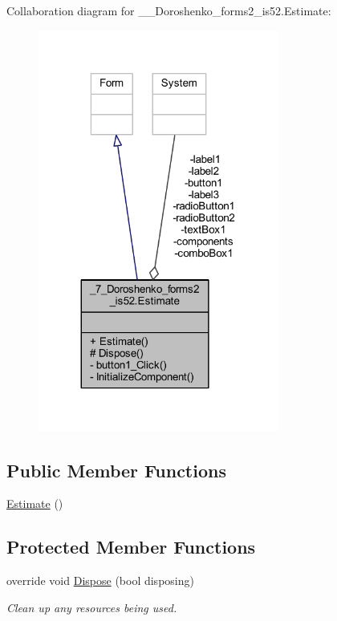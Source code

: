Collaboration diagram for \+\_\+\_\+\+Doroshenko\+\_\+forms2\+\_\+is52.\+Estimate\+:
\nopagebreak
\begin{figure}[H]
\begin{center}
\leavevmode
\includegraphics[width=224pt]{class__7___doroshenko__forms2__is52_1_1_estimate__coll__graph}
\end{center}
\end{figure}
\subsection*{Public Member Functions}
\begin{DoxyCompactItemize}
\item 
\hyperlink{class__7___doroshenko__forms2__is52_1_1_estimate_a8b51b4a73ab5d29d09494603f1493739}{Estimate} ()
\end{DoxyCompactItemize}
\subsection*{Protected Member Functions}
\begin{DoxyCompactItemize}
\item 
override void \hyperlink{class__7___doroshenko__forms2__is52_1_1_estimate_abffe80b5045e2981127d003b617f9e7a}{Dispose} (bool disposing)
\begin{DoxyCompactList}\small\item\em Clean up any resources being used. \end{DoxyCompactList}\end{DoxyCompactItemize}
